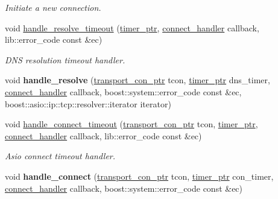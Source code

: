 \begin{DoxyCompactItemize}
\begin{DoxyCompactList}\small\item\em Initiate a new connection. \end{DoxyCompactList}\item 
void \hyperlink{classwebsocketpp_1_1transport_1_1asio_1_1endpoint_ac240587f91cf837babbbb7c48b3cff40}{handle\+\_\+resolve\+\_\+timeout} (\hyperlink{classwebsocketpp_1_1transport_1_1asio_1_1endpoint_a29e73e24476c2b3cef35963613653450}{timer\+\_\+ptr}, \hyperlink{namespacewebsocketpp_1_1transport_ac392fca34e946b48414278c0c3addfa5}{connect\+\_\+handler} callback, lib\+::error\+\_\+code const \&ec)
\begin{DoxyCompactList}\small\item\em D\+NS resolution timeout handler. \end{DoxyCompactList}\item 
void {\bfseries handle\+\_\+resolve} (\hyperlink{classwebsocketpp_1_1transport_1_1asio_1_1endpoint_ac5fc306f32d15f92dd1b22366eaba62d}{transport\+\_\+con\+\_\+ptr} tcon, \hyperlink{classwebsocketpp_1_1transport_1_1asio_1_1endpoint_a29e73e24476c2b3cef35963613653450}{timer\+\_\+ptr} dns\+\_\+timer, \hyperlink{namespacewebsocketpp_1_1transport_ac392fca34e946b48414278c0c3addfa5}{connect\+\_\+handler} callback, boost\+::system\+::error\+\_\+code const \&ec, boost\+::asio\+::ip\+::tcp\+::resolver\+::iterator iterator)\hypertarget{classwebsocketpp_1_1transport_1_1asio_1_1endpoint_a46c99ce0dc2b96651c1cbef1e760a7f0}{}\label{classwebsocketpp_1_1transport_1_1asio_1_1endpoint_a46c99ce0dc2b96651c1cbef1e760a7f0}

\item 
void \hyperlink{classwebsocketpp_1_1transport_1_1asio_1_1endpoint_adf26b0ddc55fd6d223fd74be9e25d961}{handle\+\_\+connect\+\_\+timeout} (\hyperlink{classwebsocketpp_1_1transport_1_1asio_1_1endpoint_ac5fc306f32d15f92dd1b22366eaba62d}{transport\+\_\+con\+\_\+ptr} tcon, \hyperlink{classwebsocketpp_1_1transport_1_1asio_1_1endpoint_a29e73e24476c2b3cef35963613653450}{timer\+\_\+ptr}, \hyperlink{namespacewebsocketpp_1_1transport_ac392fca34e946b48414278c0c3addfa5}{connect\+\_\+handler} callback, lib\+::error\+\_\+code const \&ec)
\begin{DoxyCompactList}\small\item\em Asio connect timeout handler. \end{DoxyCompactList}\item 
void {\bfseries handle\+\_\+connect} (\hyperlink{classwebsocketpp_1_1transport_1_1asio_1_1endpoint_ac5fc306f32d15f92dd1b22366eaba62d}{transport\+\_\+con\+\_\+ptr} tcon, \hyperlink{classwebsocketpp_1_1transport_1_1asio_1_1endpoint_a29e73e24476c2b3cef35963613653450}{timer\+\_\+ptr} con\+\_\+timer, \hyperlink{namespacewebsocketpp_1_1transport_ac392fca34e946b48414278c0c3addfa5}{connect\+\_\+handler} callback, boost\+::system\+::error\+\_\+code const \&ec)\hypertarget{classwebsocketpp_1_1transport_1_1asio_1_1endpoint_ad5a302b260e055ed9ea684d0ffb4aea4}{}\label{classwebsocketpp_1_1transport_1_1asio_1_1endpoint_ad5a302b260e055ed9ea684d0ffb4aea4}


\end{DoxyCompactItemize}
